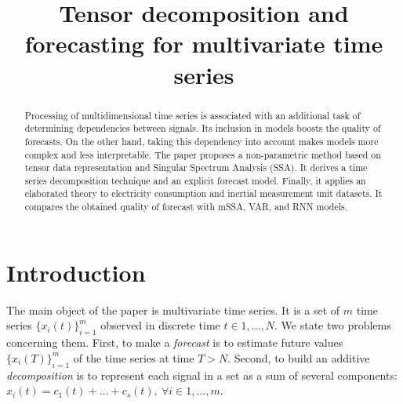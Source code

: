 \documentclass[referee, pdflatex, sn-mathphys-num]{sn-jnl}
\theoremstyle{definition}
\theoremstyle{plain}
\begin{document}
	
	\title{Tensor decomposition and forecasting for multivariate time series}
	
	\author*[1]{ }
	\author*[2]{ }
	
	
	
	\maketitle
	
	\begin{abstract}
		
		Processing of multidimensional time series is associated with an additional task of determining dependencies between signals. Its inclusion in models boosts the quality of forecasts. On the other hand, taking this dependency into account makes models more complex and less interpretable. The paper proposes a non-parametric method based on tensor data representation and Singular Spectrum Analysis (SSA). It derives a time series decomposition technique and an explicit forecast model. Finally, it applies an elaborated theory to electricity consumption and inertial measurement unit datasets. It compares the obtained quality of forecast with mSSA, VAR, and RNN models.
		
	\end{abstract}
	
	\section{Introduction}\label{Intro}
	
	The main object of the paper is multivariate time series. It is a set of $ m $ time series $ \{x_i(t)\}_{i=1}^m $ observed in discrete time $ t \in 1 , \ldots , N $.	We state two problems concerning them. First, to make a \emph{forecast} is to estimate future values $ \{x_i(T)\}_{i=1}^m $ of the time series at time $ T > N $. Second, to build an additive \emph{decomposition} is to represent each signal in a set as a sum of several components: $ x_i(t) = c_1(t) + \ldots + c_s(t), \ \forall i \in 1, \ldots , m $.
	
\end{document}

